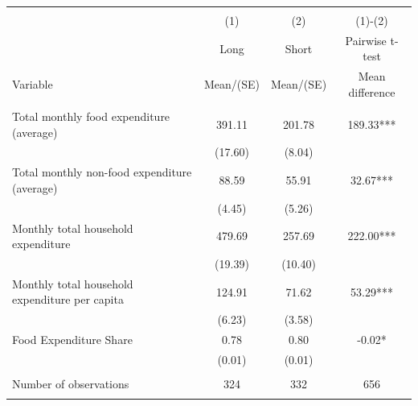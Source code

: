 
\begin{tabular}{@{\extracolsep{5pt}}lccc}
\\[-1.8ex]\hline \hline \\[-1.8ex]
 & \multicolumn{1}{c}{(1)}  & \multicolumn{1}{c}{(2)}  & \multicolumn{1}{c}{(1)-(2)} \\
 & \multicolumn{1}{c}{Long}  & \multicolumn{1}{c}{Short}  & \multicolumn{1}{c}{Pairwise t-test}  \\
Variable & Mean/(SE) & Mean/(SE) & Mean difference \\ \hline \\[-1.8ex] 
Total monthly food expenditure (average)   & 391.11    & 201.78    & 189.33***   \\
 & (17.60)  & (8.04)  &  \\ [1ex]
Total monthly non-food expenditure (average)   & 88.59    & 55.91    & 32.67***   \\
 & (4.45)  & (5.26)  &  \\ [1ex]
Monthly total household expenditure   & 479.69    & 257.69    & 222.00***   \\
 & (19.39)  & (10.40)  &  \\ [1ex]
Monthly total household expenditure per capita   & 124.91    & 71.62    & 53.29***   \\
 & (6.23)  & (3.58)  &  \\ [1ex]
Food Expenditure Share   & 0.78    & 0.80    & -0.02*   \\
 & (0.01)  & (0.01)  &  \\ [1ex]
\hline \\[-1.8ex]
Number of observations  & 324   & 332  & 656  \\
\hline \hline \\[-1.8ex]

\end{tabular}
